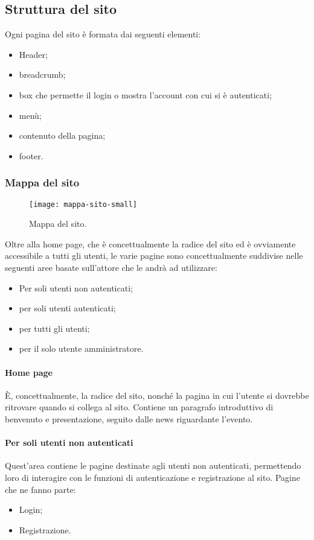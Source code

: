 \subsection{Struttura del sito}
Ogni pagina del sito è formata dai seguenti elementi:
\begin{itemize}
	\item Header;
	\item breadcrumb;
	\item box che permette il login o mostra l'account con cui si è autenticati;
	\item menù;
	\item contenuto della pagina;
	\item footer.
\end{itemize}

\subsubsection{Mappa del sito}
\begin{figure}[H]
	\centering
	\texttt{[image: mappa-sito-small]}
	\caption{Mappa del sito.}
\end{figure}
Oltre alla home page, che è concettualmente la radice del sito ed è ovviamente accessibile a tutti gli utenti, le varie pagine sono concettualmente suddivise nelle seguenti aree basate sull'attore che le andrà ad utilizzare:
\begin{itemize}
	\item Per soli utenti non autenticati;
	\item per soli utenti autenticati;
	\item per tutti gli utenti;
	\item per il solo utente amministratore.
\end{itemize}

\paragraph{Home page}
È, concettualmente, la radice del sito, nonché la pagina in cui l'utente si dovrebbe ritrovare quando si collega al sito. Contiene un paragrafo introduttivo di benvenuto e presentazione, seguito dalle news riguardante l'evento.

\paragraph{Per soli utenti non autenticati}
Quest'area contiene le pagine destinate agli utenti non autenticati, permettendo loro di interagire con le funzioni di autenticazione e registrazione al sito.
Pagine che ne fanno parte:
\begin{itemize}
	\item Login;
	\item Registrazione.
\end{itemize}

